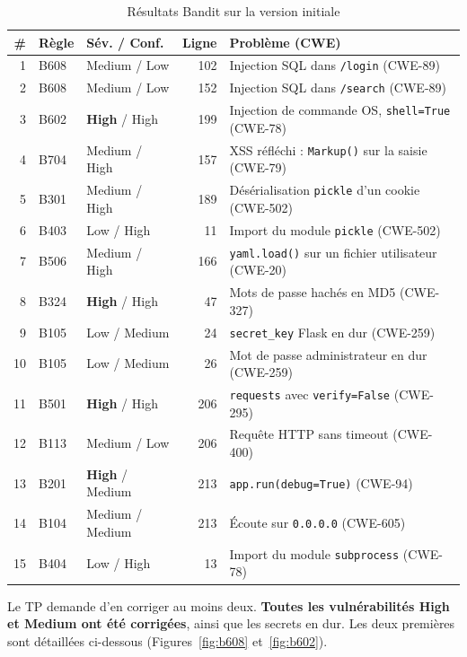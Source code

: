 \documentclass[11pt,a4paper]{article}
\newcommand{\code}[1]{\texttt{#1}}
\begin{document}
\begin{table}[H]
\centering
\small
\begin{tabularx}{\textwidth}{@{}rllrL@{}}
\toprule
\textbf{\#} & \textbf{Règle} & \textbf{Sév. / Conf.} & \textbf{Ligne} & \textbf{Problème (CWE)} \\
  & B608 & Medium / Low    & 102 & Injection SQL dans \code{/login} (CWE-89) \\
2  & B608 & Medium / Low    & 152 & Injection SQL dans \code{/search} (CWE-89) \\
3  & B602 & \textbf{High} / High & 199 & Injection de commande OS, \code{shell=True} (CWE-78) \\
4  & B704 & Medium / High   & 157 & XSS réfléchi : \code{Markup()} sur la saisie (CWE-79) \\
5  & B301 & Medium / High   & 189 & Désérialisation \code{pickle} d'un cookie (CWE-502) \\
6  & B403 & Low / High      & 11  & Import du module \code{pickle} (CWE-502) \\
7  & B506 & Medium / High   & 166 & \code{yaml.load()} sur un fichier utilisateur (CWE-20) \\
8  & B324 & \textbf{High} / High & 47 & Mots de passe hachés en MD5 (CWE-327) \\
9  & B105 & Low / Medium    & 24  & \code{secret\_key} Flask en dur (CWE-259) \\
10 & B105 & Low / Medium    & 26  & Mot de passe administrateur en dur (CWE-259) \\
11 & B501 & \textbf{High} / High & 206 & \code{requests} avec \code{verify=False} (CWE-295) \\
12 & B113 & Medium / Low    & 206 & Requête HTTP sans timeout (CWE-400) \\
13 & B201 & \textbf{High} / Medium & 213 & \code{app.run(debug=True)} (CWE-94) \\
14 & B104 & Medium / Medium & 213 & Écoute sur \code{0.0.0.0} (CWE-605) \\
15 & B404 & Low / High      & 13  & Import du module \code{subprocess} (CWE-78) \\
\bottomrule
\end{tabularx}
\caption{Résultats Bandit sur la version initiale}
\end{table}

Le TP demande d'en corriger au moins deux. \textbf{Toutes les vulnérabilités High et Medium
ont été corrigées}, ainsi que les secrets en dur. Les deux premières sont détaillées
ci-dessous (Figures~\ref{fig:b608} et~\ref{fig:b602}).
\end{document}
